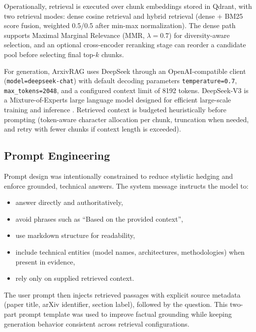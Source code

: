\documentclass[a4paper,12pt]{article}
\begin{document}
Operationally, retrieval is executed over chunk embeddings stored in Qdrant, with two retrieval modes: dense cosine retrieval and hybrid retrieval (dense + BM25 score fusion, weighted 0.5/0.5 after min-max normalization)\cite{robertson2009bm25}. The dense path supports Maximal Marginal Relevance (MMR, $\lambda=0.7$) for diversity-aware selection, and an optional cross-encoder reranking stage can reorder a candidate pool before selecting final top-$k$ chunks\cite{carbonell1998mmr}\cite{nogueira2019bert}.

For generation, ArxivRAG uses DeepSeek through an OpenAI-compatible client (\texttt{model=deepseek-chat}) with default decoding parameters \texttt{temperature=0.7}, \texttt{max\_tokens=2048}, and a configured context limit of 8192 tokens. DeepSeek-V3 is a Mixture-of-Experts large language model designed for efficient large-scale training and inference \cite{deepseek2024v3}. Retrieved context is budgeted heuristically before prompting (token-aware character allocation per chunk, truncation when needed, and retry with fewer chunks if context length is exceeded).

\subsection{Prompt Engineering}

Prompt design was intentionally constrained to reduce stylistic hedging and enforce grounded, technical answers. The system message instructs the model to:

\begin{itemize}
    \item answer directly and authoritatively,
    \item avoid phrases such as ``Based on the provided context'',
    \item use markdown structure for readability,
    \item include technical entities (model names, architectures, methodologies) when present in evidence,
    \item rely only on supplied retrieved context.
\end{itemize}

The user prompt then injects retrieved passages with explicit source metadata (paper title, arXiv identifier, section label), followed by the question. This two-part prompt template was used to improve factual grounding while keeping generation behavior consistent across retrieval configurations.
\end{document}

